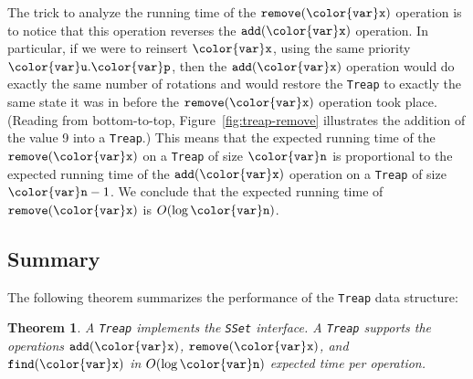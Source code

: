 \documentclass[10pt]{book}
\newcommand{\figref}[1]{Figure~\ref{fig:#1}}
\theoremstyle{plain}
\newtheorem{thm}{Theorem}[chapter]
\theoremstyle{definition}
\begin{document}
The trick to analyze the running time of the \ensuremath{\mathtt{remove({\color{var}x})}} operation is
to notice that this operation reverses the \ensuremath{\mathtt{add({\color{var}x})}} operation.
In particular, if we were to reinsert \ensuremath{\mathtt{{\color{var}x}}}, using the same priority \ensuremath{\mathtt{{\color{var}u}.{\color{var}p}}},
then the \ensuremath{\mathtt{add({\color{var}x})}} operation would do exactly the same number of rotations
and would restore the \texttt{Treap} to exactly the same state it was in before
the \ensuremath{\mathtt{remove({\color{var}x})}} operation took place.  (Reading from bottom-to-top,
\figref{treap-remove} illustrates the addition of the value 9 into a
\texttt{Treap}.) This means that the expected running time of the \ensuremath{\mathtt{remove({\color{var}x})}}
on a \texttt{Treap} of size \ensuremath{\mathtt{{\color{var}n}}} is proportional to the expected running time
of the \ensuremath{\mathtt{add({\color{var}x})}} operation on a \texttt{Treap} of size $\ensuremath{\mathtt{{\color{var}n}}}-1$.  We conclude
that the expected running time of \ensuremath{\mathtt{remove({\color{var}x})}} is $O(\log \ensuremath{\mathtt{{\color{var}n}}})$.

\subsection{Summary}

The following theorem summarizes the performance of the \texttt{Treap} data
structure:

\begin{thm}
A \texttt{Treap} implements the \texttt{SSet} interface. A \texttt{Treap} supports
the operations \ensuremath{\mathtt{add({\color{var}x})}}, \ensuremath{\mathtt{remove({\color{var}x})}}, and \ensuremath{\mathtt{find({\color{var}x})}} in $O(\log \ensuremath{\mathtt{{\color{var}n}}})$
expected time per operation.
\end{thm}
\end{document}
